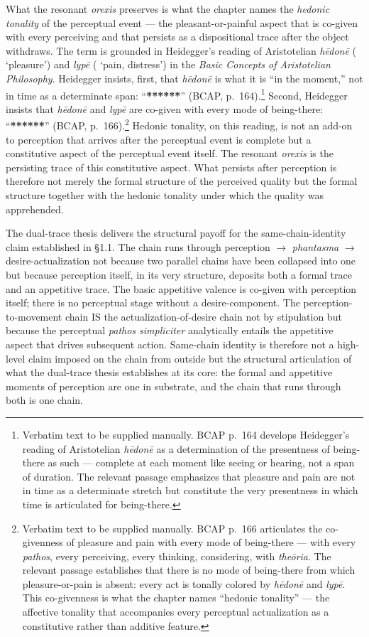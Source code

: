 What the resonant \textit{orexis} preserves is what the chapter names the \textit{hedonic tonality} of the perceptual event --- the pleasant-or-painful aspect that is co-given with every perceiving and that persists as a dispositional trace after the object withdraws. The term is grounded in Heidegger's reading of Aristotelian \textit{hēdonē} ( `pleasure') and \textit{lypē} ( `pain, distress') in the \textit{Basic Concepts of Aristotelian Philosophy}. Heidegger insists, first, that \textit{hēdonē} is what it is ``in the moment,'' not in time as a determinate span: ``\textbf{******}'' (BCAP, p.~164).\footnote{Verbatim text to be supplied manually. BCAP p.~164 develops Heidegger's reading of Aristotelian \textit{hēdonē} as a determination of the presentness of being-there as such --- complete at each moment like seeing or hearing, not a span of duration. The relevant passage emphasizes that pleasure and pain are not in time as a determinate stretch but constitute the very presentness in which time is articulated for being-there.} Second, Heidegger insists that \textit{hēdonē} and \textit{lypē} are co-given with every mode of being-there: ``\textbf{******}'' (BCAP, p.~166).\footnote{Verbatim text to be supplied manually. BCAP p.~166 articulates the co-givenness of pleasure and pain with every mode of being-there --- with every \textit{pathos}, every perceiving, every thinking, considering, with \textit{theōria}. The relevant passage establishes that there is no mode of being-there from which pleasure-or-pain is absent: every act is tonally colored by \textit{hēdonē} and \textit{lypē}. This co-givenness is what the chapter names ``hedonic tonality'' --- the affective tonality that accompanies every perceptual actualization as a constitutive rather than additive feature.} Hedonic tonality, on this reading, is not an add-on to perception that arrives after the perceptual event is complete but a constitutive aspect of the perceptual event itself. The resonant \textit{orexis} is the persisting trace of this constitutive aspect. What persists after perception is therefore not merely the formal structure of the perceived quality but the formal structure together with the hedonic tonality under which the quality was apprehended.

The dual-trace thesis delivers the structural payoff for the same-chain-identity claim established in §1.1. The chain runs through perception $\rightarrow$ \textit{phantasma} $\rightarrow$ desire-actualization not because two parallel chains have been collapsed into one but because perception itself, in its very structure, deposits both a formal trace and an appetitive trace. The basic appetitive valence is co-given with perception itself; there is no perceptual stage without a desire-component. The perception-to-movement chain IS the actualization-of-desire chain not by stipulation but because the perceptual \textit{pathos simpliciter} analytically entails the appetitive aspect that drives subsequent action. Same-chain identity is therefore not a high-level claim imposed on the chain from outside but the structural articulation of what the dual-trace thesis establishes at its core: the formal and appetitive moments of perception are one in substrate, and the chain that runs through both is one chain.

